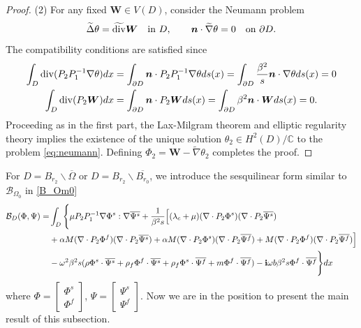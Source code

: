 \documentclass[11pt]{article}
\newcommand{\mat}{\mathbb}
\newcommand{\C}{{\mat C}}
\newcommand{\no}{\nonumber}
\newcommand{\ba}{\backslash}
\newcommand{\pa}{\partial}
\newcommand{\ov}{\overline}
\newcommand{\dive}{{\rm div}}
\newcommand{\Om}{\Omega}
\newcommand{\la}{\lambda}
\newcommand{\wid}{\widetilde}
\newcommand{\bs}{\boldsymbol}
\begin{document}
\begin{proof}
(2) For any fixed $\bs{W}\in V(D)$, consider the Neumann problem
\begin{equation}\label{eq:neumann}
\wid{\Delta}\theta=\wid{\dive}\bs{W} \quad\text{in } D, \qquad \bs{n}\cdot \wid{\nabla}\theta=0 
\quad\text{on } \pa D.
\end{equation}
The compatibility conditions are satisfied since
\begin{equation*}
\begin{aligned}
\int_{D}\dive(P_2P_1^{-1}\nabla\theta)dx &=\int_{\pa D}\bs{n}\cdot P_2P_1^{-1}\nabla\theta ds(x)= 
\int_{\pa D}\frac{\beta^2}{s}\bs{n}\cdot \nabla\theta ds(x)=0\\
\int_{D}\dive(P_2\bs{W})dx&=\int_{\pa D}\bs{n}\cdot P_2\bs{W}ds(x)= \int_{\pa D}\beta^2\bs{n}\cdot\bs{W}ds(x)=0.
\end{aligned}
\end{equation*}
Proceeding as in the first part, the Lax-Milgram theorem and elliptic regularity theory implies the 
 existence of the unique solution
$\theta_2 \in H^2(D)/\C$ to the problem \eqref{eq:neumann}. Defining $\Phi_2 = \bs{W} - \wid{\nabla}\theta_2$ 
completes the proof.
\end{proof}
For $D=B_{r_2}\ba\ov{\Om}$ or $D=B_{r_2}\ba\ov{B_{r_0}}$, we introduce the sesquilinear form similar to
 $\mathcal{B}_{\Om_0}$ in \eqref{B_Om0}
\begin{align}\label{poropmlbiform_B}
\mathcal{B}_{D}(\Phi,\Psi)=&\int_{D}\Bigg\{\mu P_2P_1^{-1}\nabla\Phi^s:\nabla\overline{\Psi^s} 
+\frac{1}{\beta^2s}\Big[(\la_c+\mu)(\nabla\cdot P_2\Phi^s)(\nabla\cdot P_2\overline{\Psi^s})\\ \no
&+\alpha M(\nabla\cdot P_2\Phi^f)(\nabla\cdot P_2\overline{\Psi^s})+\alpha M(\nabla\cdot P_2\Phi^s)
(\nabla\cdot P_2\overline{\Psi^f})+ M(\nabla\cdot P_2\Phi^f)(\nabla\cdot P_2\overline{\Psi^f})\Big]\\ \no
&-\omega^2\beta^2s(\rho\Phi^s\cdot\overline{\Psi^s} +\rho_f \Phi^f\cdot\overline{\Psi^s}+\rho_f\Phi^s
\cdot\overline{\Psi^f} +m\Phi^f\cdot\overline{\Psi^f})-{\bf i}\omega b\beta^2s\Phi^f\cdot\overline{\Psi^f} \Bigg\}dx
\end{align}
where $\Phi=\begin{bmatrix}
\Phi^s \\
\Phi^f
\end{bmatrix}$, $\Psi=\begin{bmatrix}
\Psi^s \\
\Psi^f
\end{bmatrix}$. 
Now we are in the position to present the main result of this subsection.
\end{document}
